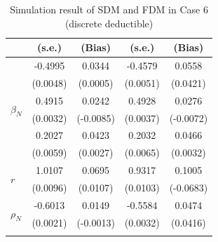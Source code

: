 \begin{table}[!ht]
{{\begin{minipage}{0.5\textwidth}
\begin{tabular}{lcccc}
        & (s.e.) & (Bias) & (s.e.) & (Bias) \\
        \midrule
        \multirow{6}{*}{$\beta_N$} & -0.4995 & 0.0344 & -0.4579 & 0.0558 \\
         & (0.0048) & (0.0005) & (0.0051) & (0.0421) \\
        \cmidrule{2-5}
         & 0.4915 & 0.0242 & 0.4928 & 0.0276 \\
         & (0.0032) & (-0.0085) & (0.0037) & (-0.0072) \\
        \cmidrule{2-5}
         & 0.2027 & 0.0423 & 0.2032 & 0.0466 \\
         & (0.0059) & (0.0027) & (0.0065) & (0.0032) \\
        \midrule
        \multirow{2}{*}{$r$} & 1.0107 & 0.0695 & 0.9317 & 0.1005 \\
         & (0.0096) & (0.0107) & (0.0103) & (-0.0683) \\
        \midrule
        \multirow{2}{*}{$\rho_N$} & -0.6013 & 0.0149 & -0.5584 & 0.0474 \\
         & (0.0021) & (-0.0013) & (0.0032) & (0.0416) \\
        \hhline{=====}
        \end{tabular}
    \end{minipage}
}
}
\caption{Simulation result of SDM and FDM in Case 6 (discrete deductible)}\label{tab:AppSimEndCase6}
\end{table}
